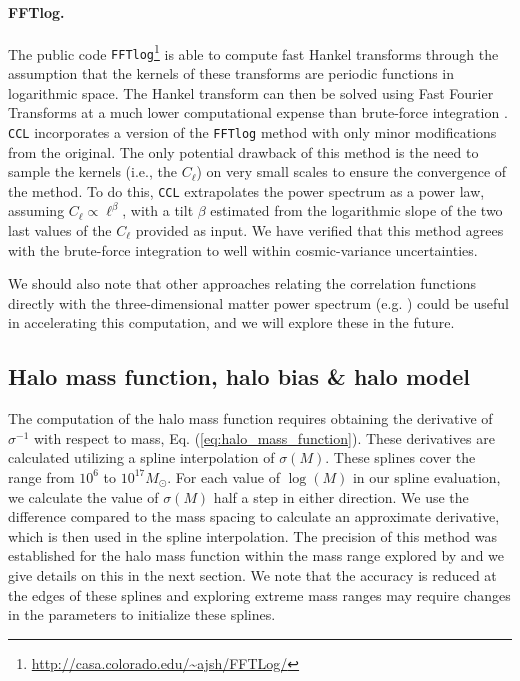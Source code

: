 \documentclass[\docopts]{\docclass}
\newcommand{\ccl}{{\tt CCL}\xspace}
\begin{document}
\paragraph{\bf FFTlog.} The public code {\tt FFTlog}\footnote{\url{http://casa.colorado.edu/~ajsh/FFTLog/}} is able to compute fast Hankel transforms through the assumption that the kernels of these transforms are periodic functions in logarithmic space. The Hankel transform can then be solved using Fast Fourier Transforms at a much lower computational expense than brute-force integration \citep{Hamilton2000,Talman2009}. \ccl incorporates a version of the {\tt FFTlog} method with only minor modifications from the original. The only potential drawback of this method is the need to sample the kernels (i.e., the $C_\ell$) on very small scales to ensure the convergence of the method. To do this, \ccl extrapolates the power spectrum as a power law, assuming $C_\ell\propto\ell^\beta$, with a tilt $\beta$ estimated from the logarithmic slope of the two last values of the $C_\ell$ provided as input. We have verified that this method agrees with the brute-force integration to well within cosmic-variance uncertainties.

We should also note that other approaches relating the correlation functions directly with the three-dimensional matter power spectrum (e.g. \citealt{2017ApJ...845...28C}) could be useful in accelerating this computation, and we will explore these in the future.


\subsection{Halo mass function, halo bias \& halo model}

The computation of the halo mass function requires obtaining the derivative of $\sigma^{-1}$ with respect to mass, Eq. (\ref{eq:halo_mass_function}). These derivatives are calculated utilizing a spline interpolation of $\sigma(M)$. These splines cover the range from $10^6$ to $10^{17} M_\odot$. For each value of $\log(M)$ in our spline evaluation, we calculate the value of $\sigma(M)$ half a step in either direction. We use the difference compared to the mass spacing to calculate an approximate derivative, which is then used in the spline interpolation. The precision of this method was established for the halo mass function within the mass range explored by \citet{Tinker2010} and we give details on this in the next section. We note that the accuracy is reduced at the edges of these splines and exploring extreme mass ranges may require changes in the parameters to initialize these splines.
\end{document}
